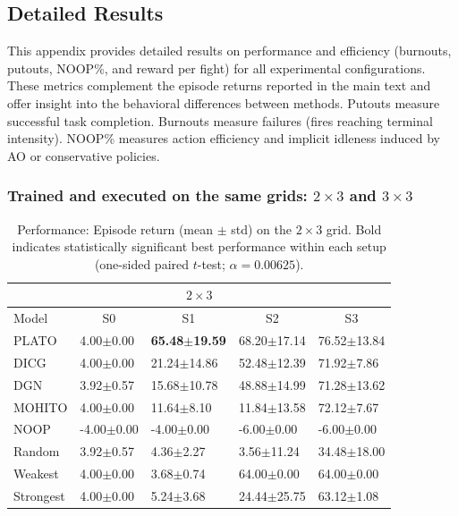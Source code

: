 \subsection{Detailed Results}\label{Detailed_Results}

This appendix provides detailed results on performance and efficiency (burnouts, putouts, NOOP\%, and reward per fight) for all experimental configurations.
These metrics complement the episode returns reported in the main text and offer insight into the behavioral differences between methods. Putouts measure successful task completion. Burnouts measure failures (fires reaching terminal intensity). NOOP\% measures action efficiency and implicit idleness induced by AO or conservative policies. 

\subsubsection{Trained and executed on the same grids: $2\times 3$ and $3\times 3$}
\label{Additional_Results}

\begin{table}[t]
\centering
\small
\setlength{\tabcolsep}{2.5pt}
\renewcommand{\arraystretch}{1.03}
\begin{tabular}{l|l|l|l|l}
\toprule
\multicolumn{5}{c}{$2\times 3$} \\
\midrule
Model & \multicolumn{1}{c|}{S0} & \multicolumn{1}{c|}{S1} & \multicolumn{1}{c|}{S2} & \multicolumn{1}{c}{S3} \\
\midrule
PLATO & 4.00$\pm$0.00 & \textbf{65.48$\pm$19.59} & 68.20$\pm$17.14 & 76.52$\pm$13.84 \\
DICG & 4.00$\pm$0.00 & 21.24$\pm$14.86 & 52.48$\pm$12.39 & 71.92$\pm$7.86 \\
DGN & 3.92$\pm$0.57 & 15.68$\pm$10.78 & 48.88$\pm$14.99 & 71.28$\pm$13.62 \\
MOHITO  & 4.00$\pm$0.00 & 11.64$\pm$8.10 & 11.84$\pm$13.58 & 72.12$\pm$7.67 \\
NOOP & -4.00$\pm$0.00 & -4.00$\pm$0.00 & -6.00$\pm$0.00 & -6.00$\pm$0.00 \\
Random & 3.92$\pm$0.57 & 4.36$\pm$2.27 & 3.56$\pm$11.24 & 34.48$\pm$18.00 \\
Weakest & 4.00$\pm$0.00 & 3.68$\pm$0.74 & 64.00$\pm$0.00 & 64.00$\pm$0.00 \\
Strongest & 4.00$\pm$0.00 & 5.24$\pm$3.68 & 24.44$\pm$25.75 & 63.12$\pm$1.08 \\


\bottomrule
\end{tabular}
\caption{Performance: Episode return (mean $\pm$ std) on the $2\times 3$ grid. Bold indicates statistically significant best performance within each setup (one-sided paired $t$-test; $\alpha=0.00625$).}
\label{tab:reward_2x3}
\end{table}




